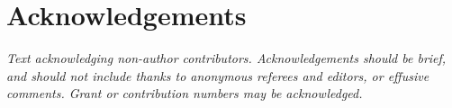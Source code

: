 \section{Acknowledgements}

\textit{Text acknowledging non-author contributors. Acknowledgements should be brief, and should not include thanks to anonymous referees and editors, or effusive comments. Grant or contribution numbers may be acknowledged.}